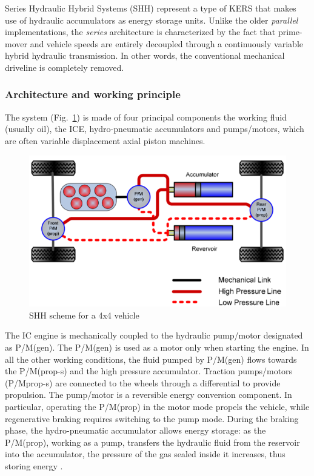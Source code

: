 \documentclass[11pt]{article}
\begin{document}
Series Hydraulic Hybrid Systems (SHH) represent a type of KERS that makes use of hydraulic accumulators as energy storage units. Unlike the older \textit{parallel} implementations, the \textit{series} architecture is characterized by the fact that prime-mover and vehicle speeds are entirely decoupled through a continuously variable hybrid hydraulic transmission. In other words, the conventional mechanical driveline is completely removed.

\subsubsection{Architecture and working principle}

The system (Fig.~\ref{SHH_scheme}) is made of four principal components \cite{d} the working fluid (usually oil), the ICE, hydro-pneumatic accumulators and pumps/motors, which are often variable displacement axial piston machines.

\begin{figure}[H]
\centering
\includegraphics[width=.6\textwidth]{Images/State_of_the_art/Hydraulic KERS.png}
\caption{SHH scheme for a 4x4 vehicle}
\label{SHH_scheme}
\end{figure}

The IC engine is mechanically coupled to the hydraulic pump/motor designated as P/M(gen). The P/M(gen) is used as a motor only when starting the engine. In all the other working conditions, the fluid pumped by P/M(gen) flows towards the P/M(prop-s) and the high pressure accumulator. Traction pumps/motors (P/Mprop-s) are connected to the wheels through a differential to provide propulsion. The pump/motor is a reversible energy conversion component. In particular, operating the P/M(prop) in the motor mode propels the vehicle, while regenerative braking requires switching to the pump mode. During the braking phase, the hydro-pneumatic accumulator allows energy storage: as the P/M(prop), working as a pump, transfers the hydraulic fluid from the reservoir into the accumulator, the pressure of the gas sealed inside it increases, thus storing energy \cite{e}. 
\end{document}
